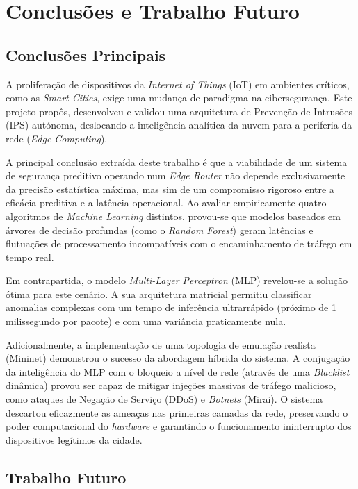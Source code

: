 \chapter{Conclusões e Trabalho Futuro}
\label{chap:conc-trab-futuro}
\section{Conclusões Principais}
\label{chap5:sec:conclusoes_principais}

A proliferação de dispositivos da \textit{Internet of Things} (IoT) em ambientes críticos, como as \textit{Smart Cities}, exige uma mudança de paradigma na cibersegurança. Este projeto propôs, desenvolveu e validou uma arquitetura de Prevenção de Intrusões (IPS) autónoma, deslocando a inteligência analítica da nuvem para a periferia da rede (\textit{Edge Computing}).

A principal conclusão extraída deste trabalho é que a viabilidade de um sistema de segurança preditivo operando num \textit{Edge Router} não depende exclusivamente da precisão estatística máxima, mas sim de um compromisso rigoroso entre a eficácia preditiva e a latência operacional. Ao avaliar empiricamente quatro algoritmos de \textit{Machine Learning} distintos, provou-se que modelos baseados em árvores de decisão profundas (como o \textit{Random Forest}) geram latências e flutuações de processamento incompatíveis com o encaminhamento de tráfego em tempo real. 

Em contrapartida, o modelo \textit{Multi-Layer Perceptron} (MLP) revelou-se a solução ótima para este cenário. A sua arquitetura matricial permitiu classificar anomalias complexas com um tempo de inferência ultrarrápido (próximo de 1 milissegundo por pacote) e com uma variância praticamente nula. 

Adicionalmente, a implementação de uma topologia de emulação realista (Mininet) demonstrou o sucesso da abordagem híbrida do sistema. A conjugação da inteligência do MLP com o bloqueio a nível de rede (através de uma \textit{Blacklist} dinâmica) provou ser capaz de mitigar injeções massivas de tráfego malicioso, como ataques de Negação de Serviço (DDoS) e \textit{Botnets} (Mirai). O sistema descartou eficazmente as ameaças nas primeiras camadas da rede, preservando o poder computacional do \textit{hardware} e garantindo o funcionamento ininterrupto dos dispositivos legítimos da cidade.

\section{Trabalho Futuro}
\label{chap5:sec:trabalho_futuro}

